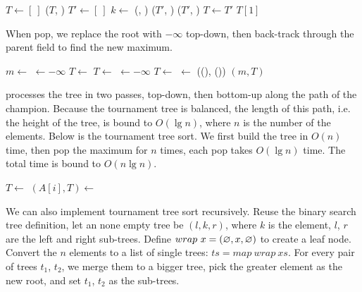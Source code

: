 \documentclass[b5paper]{article}
\begin{document}
\begin{algorithmic}[1]
  \State $T \gets [\ ]$
    \State {}($T$, )
  \EndFor
    \State $T' \gets [\ ]$
      \State $k \gets$ (, )
      \State {}($T'$, )
    \EndFor
      \State {}($T'$, )
    \EndIf
    \State $T \gets T'$
  \EndWhile
  \State \Return $T[1]$
\EndFunction
\end{algorithmic}

When pop, we replace the root with $-\infty$ top-down, then back-track through the parent field to find the new maximum.

\begin{algorithmic}[1]
  \State $m \gets$ 
  \State {} $\gets -\infty$
    
      \State $T \gets$ 
    \Else
      \State $T \gets$ 
    \EndIf
    \State {} $\gets -\infty$
  \EndWhile
   
    \State $T \gets$ 
    \State {} $\gets$ ((), ())
  \EndWhile
  \State \Return $(m, T)$ 
\EndFunction
\end{algorithmic}

 processes the tree in two passes, top-down, then bottom-up along the path of the champion. Because the tournament tree is balanced, the length of this path, i.e. the height of the tree, is bound to $O(\lg n)$, where $n$ is the number of the elements. Below is the tournament tree sort. We first build the tree in $O(n)$ time, then pop the maximum for $n$ times, each pop takes $O(\lg n)$ time. The total time is bound to $O(n \lg n)$.

\begin{algorithmic}
  \State $T \gets$ 
    \State $(A[i], T) \gets$ 
  \EndFor
\EndProcedure
\end{algorithmic}

We can also implement tournament tree sort recursively. Reuse the binary search tree definition, let an none empty tree be $(l, k, r)$, where $k$ is the element, $l$, $r$ are the left and right sub-trees. Define $wrap\ x = (\varnothing, x, \varnothing)$ to create a leaf node. Convert the $n$ elements to a list of single trees: $ts = map\ wrap\ xs$. For every pair of trees $t_1$, $t_2$, we merge them to a bigger tree, pick the greater element as the new root, and set $t_1$, $t_2$ as the sub-trees.
\end{document}
